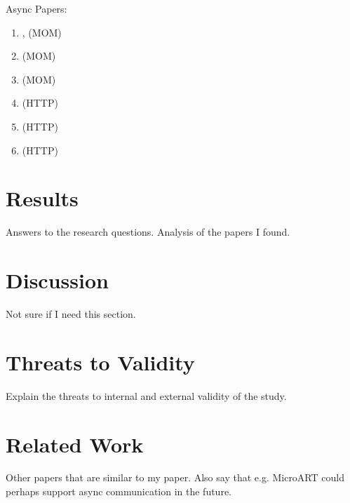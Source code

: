 Async Papers:
\begin{enumerate}
	\item \cite{Singh2022ARCHI4MOM}, \cite{Singh2021} (MOM)
	\item \cite{Alshuqayran2018MiSAR} (MOM)
	\item \cite{Brosig2011} (MOM)
	\item \cite{Mayer2018} (HTTP)
	\item \cite{Kleehaus2018} (HTTP)
	\item \cite{Ntentos2021} (HTTP)
\end{enumerate}

\section{Results}
Answers to the research questions.
Analysis of the papers I found.

\section{Discussion}
Not sure if I need this section.

\section{Threats to Validity}
Explain the threats to internal and external validity of the study.

\section{Related Work}
Other papers that are similar to my paper.
Also say that e.g. MicroART could perhaps support async communication in the future.
\cite{Granchelli2017MicroART}
\cite{Ducasse2009}



